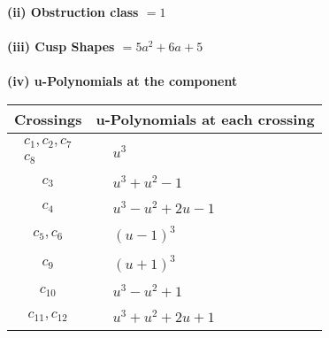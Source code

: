 \documentclass[1p]{elsarticle_modified}
\theoremstyle{definition}
\begin{document}
\flushleft \textbf{(ii) Obstruction class $= 1$}\\~\\
\flushleft \textbf{(iii) Cusp Shapes $= 5 a^2+6 a+5$}\\~\\
\newpage\renewcommand{\arraystretch}{1}
\flushleft \textbf{(iv) u-Polynomials at the component}\newline \\
\begin{tabular}{m{50pt}|m{274pt}}
Crossings & \hspace{64pt}u-Polynomials at each crossing \\
\hline $$\begin{aligned}c_{1},c_{2},c_{7}\\c_{8}\end{aligned}$$&$\begin{aligned}
&u^3
\end{aligned}$\\
\hline $$\begin{aligned}c_{3}\end{aligned}$$&$\begin{aligned}
&u^3+u^2-1
\end{aligned}$\\
\hline $$\begin{aligned}c_{4}\end{aligned}$$&$\begin{aligned}
&u^3- u^2+2 u-1
\end{aligned}$\\
\hline $$\begin{aligned}c_{5},c_{6}\end{aligned}$$&$\begin{aligned}
&(u-1)^3
\end{aligned}$\\
\hline $$\begin{aligned}c_{9}\end{aligned}$$&$\begin{aligned}
&(u+1)^3
\end{aligned}$\\
\hline $$\begin{aligned}c_{10}\end{aligned}$$&$\begin{aligned}
&u^3- u^2+1
\end{aligned}$\\
\hline $$\begin{aligned}c_{11},c_{12}\end{aligned}$$&$\begin{aligned}
&u^3+u^2+2 u+1
\end{aligned}$\\
\hline
\end{tabular}\\~\\
\end{document}
